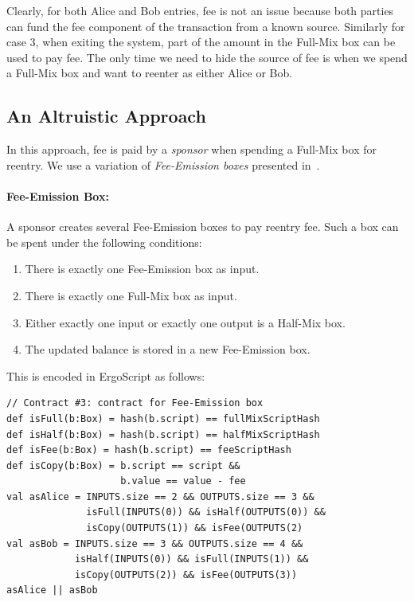 \documentclass[runningheads]{llncs}
\newcommand{\langname}{ErgoScript\xspace}
\begin{document}
Clearly, for both Alice and Bob entries, fee is not an issue because both parties can fund the fee component of the transaction from a known source. Similarly for case 3, when exiting the system, part of the amount in the Full-Mix box can be used to pay fee. The only time we need to hide the source of fee is when we spend a Full-Mix box and want to reenter as either Alice or Bob. 

\subsection{An Altruistic Approach}
\label{donation}

In this approach, fee is paid by a {\em sponsor} when spending a Full-Mix box for reentry. 
We use a variation of {\em Fee-Emission boxes} presented in~\cite{Fee-Emission}. 

\paragraph{Fee-Emission Box:} A sponsor creates several Fee-Emission boxes to pay reentry fee. Such a box can be spent under the following conditions:

\begin{enumerate}
    \item There is exactly one Fee-Emission box as input.
    \item There is exactly one Full-Mix box as input.
    \item Either exactly one input or exactly one output is a Half-Mix box.
    \item The updated balance is stored in a new Fee-Emission box.
\end{enumerate}

This is encoded in \langname as follows:

{\small
\begin{Verbatim}[frame=single]
// Contract #3: contract for Fee-Emission box
def isFull(b:Box) = hash(b.script) == fullMixScriptHash 
def isHalf(b:Box) = hash(b.script) == halfMixScriptHash
def isFee(b:Box) = hash(b.script) == feeScriptHash
def isCopy(b:Box) = b.script == script && 
                    b.value == value - fee
val asAlice = INPUTS.size == 2 && OUTPUTS.size == 3 &&
              isFull(INPUTS(0)) && isHalf(OUTPUTS(0)) &&
              isCopy(OUTPUTS(1)) && isFee(OUTPUTS(2)
val asBob = INPUTS.size == 3 && OUTPUTS.size == 4 &&
            isHalf(INPUTS(0)) && isFull(INPUTS(1)) &&
            isCopy(OUTPUTS(2)) && isFee(OUTPUTS(3))
asAlice || asBob 
\end{Verbatim}
}
\end{document}
